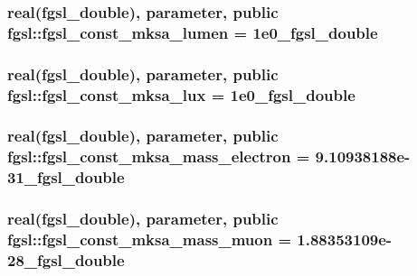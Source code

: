 \subsubsection[{fgsl\+\_\+const\+\_\+mksa\+\_\+lumen}]{\setlength{\rightskip}{0pt plus 5cm}real({\bf fgsl\+\_\+double}), parameter, public fgsl\+::fgsl\+\_\+const\+\_\+mksa\+\_\+lumen = 1e0\+\_\+fgsl\+\_\+double}\label{namespacefgsl_a7bb4dd075b4ec4613ff976153a8a42dd}
\hypertarget{namespacefgsl_a38e1e1db82aff58851133f55d981feed}{}
\subsubsection[{fgsl\+\_\+const\+\_\+mksa\+\_\+lux}]{\setlength{\rightskip}{0pt plus 5cm}real({\bf fgsl\+\_\+double}), parameter, public fgsl\+::fgsl\+\_\+const\+\_\+mksa\+\_\+lux = 1e0\+\_\+fgsl\+\_\+double}\label{namespacefgsl_a38e1e1db82aff58851133f55d981feed}
\hypertarget{namespacefgsl_a9b37f99c3856817b93dd18bc94b81725}{}
\subsubsection[{fgsl\+\_\+const\+\_\+mksa\+\_\+mass\+\_\+electron}]{\setlength{\rightskip}{0pt plus 5cm}real({\bf fgsl\+\_\+double}), parameter, public fgsl\+::fgsl\+\_\+const\+\_\+mksa\+\_\+mass\+\_\+electron = 9.\+10938188e-\/31\+\_\+fgsl\+\_\+double}\label{namespacefgsl_a9b37f99c3856817b93dd18bc94b81725}
\hypertarget{namespacefgsl_afcace800f07f1c2e9703336d2ff02ba4}{}
\subsubsection[{fgsl\+\_\+const\+\_\+mksa\+\_\+mass\+\_\+muon}]{\setlength{\rightskip}{0pt plus 5cm}real({\bf fgsl\+\_\+double}), parameter, public fgsl\+::fgsl\+\_\+const\+\_\+mksa\+\_\+mass\+\_\+muon = 1.\+88353109e-\/28\+\_\+fgsl\+\_\+double}\label{namespacefgsl_afcace800f07f1c2e9703336d2ff02ba4}
\hypertarget{namespacefgsl_a4480f5ff7a83600820b4cdaa8aff929e}{}
